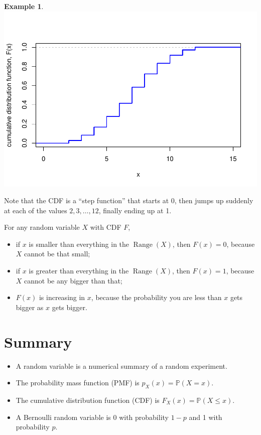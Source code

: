 \documentclass[
  a4paper,
]{book}
\providecommand{\tightlist}{%
  \setlength{\itemsep}{0pt}\setlength{\parskip}{0pt}}
\theoremstyle{definition}
\theoremstyle{definition}
\newtheorem{example}{Example}[chapter]
\theoremstyle{definition}
\theoremstyle{definition}
\theoremstyle{remark}
\begin{document}
\begin{example}
\includegraphics{math1710_files/figure-latex/dice-cdf-1.pdf}

Note that the CDF is a ``step function'' that starts at 0, then jumps up suddenly at each of the values \(2, 3, \dots, 12\), finally ending up at 1.
\end{example}

For any random variable \(X\) with CDF \(F\),

\begin{itemize}
\tightlist
\item
  if \(x\) is smaller than everything in the \(\operatorname{Range}(X)\), then \(F(x) = 0\), because \(X\) cannot be that small;
\item
  if \(x\) is greater than everything in the \(\operatorname{Range}(X)\), then \(F(x) = 1\), because \(X\) cannot be any bigger than that;
\item
  \(F(x)\) is increasing in \(x\), because the probability you are less than \(x\) gets bigger as \(x\) gets bigger.
\end{itemize}

\hypertarget{summary-L09}{%
\section*{Summary}\label{summary-L09}}

\begin{itemize}
\tightlist
\item
  A random variable is a numerical summary of a random experiment.
\item
  The probability mass function (PMF) is \(p_X(x) = \mathbb P(X = x)\).
\item
  The cumulative distribution function (CDF) is \(F_X(x) = \mathbb P(X \leq x)\).
\item
  A Bernoulli random variable is 0 with probability \(1-p\) and 1 with probability \(p\).
\end{itemize}
\end{document}
